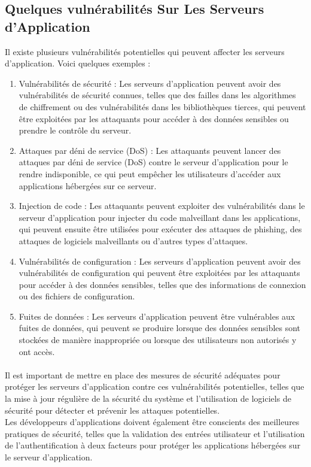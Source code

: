 \subsection{Quelques vulnérabilités Sur Les Serveurs d'Application }
Il existe plusieurs vulnérabilités potentielles qui peuvent affecter les serveurs d'application. Voici quelques exemples :
\begin{enumerate}
\item   Vulnérabilités de sécurité : Les serveurs d'application peuvent avoir des vulnérabilités de sécurité connues, telles que des failles dans les algorithmes de chiffrement ou des vulnérabilités dans les bibliothèques tierces, qui peuvent être exploitées par les attaquants pour accéder à des données sensibles ou prendre le contrôle du serveur.

\item   Attaques par déni de service (DoS) : Les attaquants peuvent lancer des attaques par déni de service (DoS) contre le serveur d'application pour le rendre indisponible, ce qui peut empêcher les utilisateurs d'accéder aux applications hébergées sur ce serveur.

\item   Injection de code : Les attaquants peuvent exploiter des vulnérabilités dans le serveur d'application pour injecter du code malveillant dans les applications, qui peuvent ensuite être utilisées pour exécuter des attaques de phishing, des attaques de logiciels malveillants ou d'autres types d'attaques.

\item  Vulnérabilités de configuration : Les serveurs d'application peuvent avoir des vulnérabilités de configuration qui peuvent être exploitées par les attaquants pour accéder à des données sensibles, telles que des informations de connexion ou des fichiers de configuration.

\item   Fuites de données : Les serveurs d'application peuvent être vulnérables aux fuites de données, qui peuvent se produire lorsque des données sensibles sont stockées de manière inappropriée ou lorsque des utilisateurs non autorisés y ont accès.
\end{enumerate}

\paragraph{ }

Il est important de mettre en place des mesures de sécurité adéquates pour protéger les serveurs d'application contre ces vulnérabilités potentielles, telles que la mise à jour régulière de la sécurité du système et l'utilisation de logiciels de sécurité pour détecter et prévenir les attaques potentielles.\\
 Les développeurs d'applications doivent également être conscients des meilleures pratiques de sécurité, telles que la validation des entrées utilisateur et l'utilisation de l'authentification à deux facteurs pour protéger les applications hébergées sur le serveur d'application.\\
 

